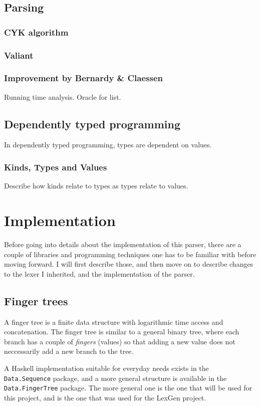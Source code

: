 \documentclass[a4paper,12pt,twosided]{report}
\begin{document}
\section{Parsing}
\subsection{CYK algorithm}
\subsection{Valiant}
\subsection{Improvement by Bernardy \& Claessen}
Running time analysis. Oracle for list.

\section{Dependently typed programming}
In dependently typed programming, types are dependent on values.

\subsection{Kinds, Types and Values}
Describe how kinds relate to types as types relate to values.

%
%

\chapter{Implementation}
Before going into details about the implementation of this parser, there are a
couple of libraries and programming techniques one has to be familiar with
before moving forward. I will first describe those, and then move on to describe
changes to the lexer I inherited, and the implementation of the parser.

\section{Finger trees}
A finger tree is a finite data structure with logarithmic time access and
concatenation. The finger tree is similar to a general binary tree, where each
branch has a couple of \textit{fingers} (values) so that adding a new value does
not neccessarily add a new branch to the tree. %

A Haskell implementation suitable for everyday needs exists in the
\texttt{Data.Sequence} package, and a more general structure is available in the
\texttt{Data.FingerTree} package. The more general one is the one that will be
used for this project, and is the one that was used for the LexGen project.
\end{document}

